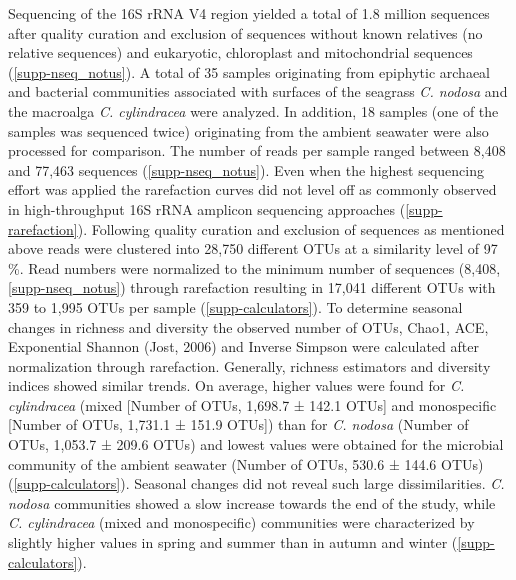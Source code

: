 \documentclass[12pt,]{article}
\begin{document}
Sequencing of the 16S rRNA V4 region yielded a total of 1.8 million
sequences after quality curation and exclusion of sequences without
known relatives (no relative sequences) and eukaryotic, chloroplast and
mitochondrial sequences (\autoref{supp-nseq_notus}). A total of 35
samples originating from epiphytic archaeal and bacterial communities
associated with surfaces of the seagrass \emph{C. nodosa} and the
macroalga \emph{C. cylindracea} were analyzed. In addition, 18 samples
(one of the samples was sequenced twice) originating from the ambient
seawater were also processed for comparison. The number of reads per
sample ranged between 8,408 and 77,463 sequences
(\autoref{supp-nseq_notus}). Even when the highest sequencing effort was
applied the rarefaction curves did not level off as commonly observed in
high-throughput 16S rRNA amplicon sequencing approaches
(\autoref{supp-rarefaction}). Following quality curation and exclusion
of sequences as mentioned above reads were clustered into 28,750
different OTUs at a similarity level of 97 \si{\percent}. Read numbers
were normalized to the minimum number of sequences (8,408,
\autoref{supp-nseq_notus}) through rarefaction resulting in 17,041
different OTUs with 359 to 1,995 OTUs per sample
(\autoref{supp-calculators}). To determine seasonal changes in richness
and diversity the observed number of OTUs, Chao1, ACE, Exponential
Shannon (Jost, 2006) and Inverse Simpson were calculated after
normalization through rarefaction. Generally, richness estimators and
diversity indices showed similar trends. On average, higher values were
found for \emph{C. cylindracea} (mixed {[}Number of OTUs, 1,698.7 ±
142.1 OTUs{]} and monospecific {[}Number of OTUs, 1,731.1 ± 151.9
OTUs{]}) than for \emph{C. nodosa} (Number of OTUs, 1,053.7 ± 209.6
OTUs) and lowest values were obtained for the microbial community of the
ambient seawater (Number of OTUs, 530.6 ± 144.6 OTUs)
(\autoref{supp-calculators}). Seasonal changes did not reveal such large
dissimilarities. \emph{C. nodosa} communities showed a slow increase
towards the end of the study, while \emph{C. cylindracea} (mixed and
monospecific) communities were characterized by slightly higher values
in spring and summer than in autumn and winter
(\autoref{supp-calculators}).
\end{document}
